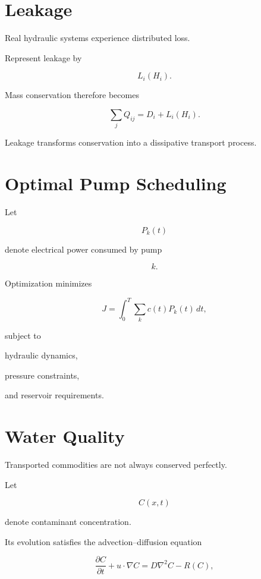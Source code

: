 \documentclass[11pt,fleqn]{book}
\numberwithin{equation}{chapter}
\theoremstyle{plain}
\theoremstyle{definition}
\theoremstyle{remark}
\begin{document}

\section{Leakage}

Real hydraulic systems experience distributed loss.

Represent leakage by

\[
L_i(H_i).
\]

Mass conservation therefore becomes

\[
\sum_j
Q_{ij}
=
D_i
+
L_i(H_i).
\]

Leakage transforms conservation into a dissipative transport process.


\section{Optimal Pump Scheduling}

Let

\[
P_k(t)
\]

denote electrical power consumed by pump

\[
k.
\]

Optimization minimizes

\[
\boxed{
J
=
\int_0^T
\sum_k
c(t)
P_k(t)
\,dt,
}
\]

subject to

hydraulic dynamics,

pressure constraints,

and reservoir requirements.


\section{Water Quality}

Transported commodities are not always conserved perfectly.

Let

\[
C(x,t)
\]

denote contaminant concentration.

Its evolution satisfies the advection--diffusion equation

\[
\boxed{
\frac{\partial C}{\partial t}
+
u\cdot\nabla C
=
D\nabla^2C
-
R(C),
}
\]
\end{document}
